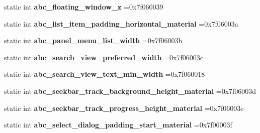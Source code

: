 \begin{DoxyCompactItemize}
static int {\bfseries abc\+\_\+floating\+\_\+window\+\_\+z} =0x7f060039
\item 
\mbox{\label{classandroid_1_1support_1_1graphics_1_1drawable_1_1R_1_1dimen_afa03a06d8f28c3a187eaa7856727dd82}} 
static int {\bfseries abc\+\_\+list\+\_\+item\+\_\+padding\+\_\+horizontal\+\_\+material} =0x7f06003a
\item 
\mbox{\label{classandroid_1_1support_1_1graphics_1_1drawable_1_1R_1_1dimen_af0ca86d3207e893e086208ef8673485d}} 
static int {\bfseries abc\+\_\+panel\+\_\+menu\+\_\+list\+\_\+width} =0x7f06003b
\item 
\mbox{\label{classandroid_1_1support_1_1graphics_1_1drawable_1_1R_1_1dimen_a5e51acfd509f51bc971ba04e12a7c9fc}} 
static int {\bfseries abc\+\_\+search\+\_\+view\+\_\+preferred\+\_\+width} =0x7f06003c
\item 
\mbox{\label{classandroid_1_1support_1_1graphics_1_1drawable_1_1R_1_1dimen_a5dd734666b1371a9062538a6b729d24c}} 
static int {\bfseries abc\+\_\+search\+\_\+view\+\_\+text\+\_\+min\+\_\+width} =0x7f060018
\item 
\mbox{\label{classandroid_1_1support_1_1graphics_1_1drawable_1_1R_1_1dimen_a5696ab6a2589aa5951b9cceb51af4c04}} 
static int {\bfseries abc\+\_\+seekbar\+\_\+track\+\_\+background\+\_\+height\+\_\+material} =0x7f06003d
\item 
\mbox{\label{classandroid_1_1support_1_1graphics_1_1drawable_1_1R_1_1dimen_a8319028142c74b9666d576e150836dd5}} 
static int {\bfseries abc\+\_\+seekbar\+\_\+track\+\_\+progress\+\_\+height\+\_\+material} =0x7f06003e
\item 
\mbox{\label{classandroid_1_1support_1_1graphics_1_1drawable_1_1R_1_1dimen_a9dd8b5940183650d40b38e93e28372a0}} 
static int {\bfseries abc\+\_\+select\+\_\+dialog\+\_\+padding\+\_\+start\+\_\+material} =0x7f06003f

\end{DoxyCompactItemize}
